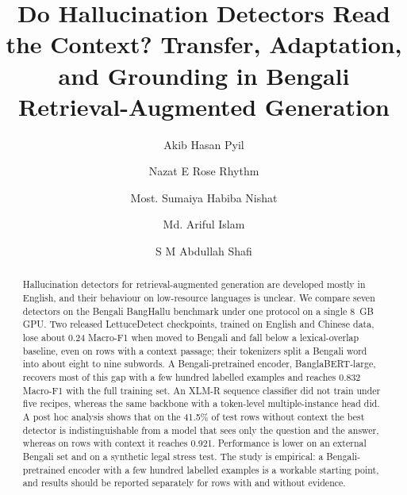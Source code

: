 \documentclass[manuscript,screen,review]{acmart}
\begin{document}
\title[Do Hallucination Detectors Read the Context?]{Do Hallucination Detectors Read the Context? Transfer, Adaptation, and Grounding in Bengali Retrieval-Augmented Generation}

\author{Akib Hasan Pyil}

\author{Nazat E Rose Rhythm}

\author{Most. Sumaiya Habiba Nishat}

\author{Md. Ariful Islam}

\author{S M Abdullah Shafi}

\renewcommand{\shortauthors}{Pyil et al.}

\begin{abstract}
Hallucination detectors for retrieval-augmented generation are developed mostly in English, and their behaviour on low-resource languages is unclear. We compare seven detectors on the Bengali BangHallu benchmark under one protocol on a single 8~GB GPU. Two released LettuceDetect checkpoints, trained on English and Chinese data, lose about 0.24 Macro-F1 when moved to Bengali and fall below a lexical-overlap baseline, even on rows with a context passage; their tokenizers split a Bengali word into about eight to nine subwords. A Bengali-pretrained encoder, BanglaBERT-large, recovers most of this gap with a few hundred labelled examples and reaches 0.832 Macro-F1 with the full training set. An XLM-R sequence classifier did not train under five recipes, whereas the same backbone with a token-level multiple-instance head did. A post hoc analysis shows that on the 41.5\% of test rows without context the best detector is indistinguishable from a model that sees only the question and the answer, whereas on rows with context it reaches 0.921. Performance is lower on an external Bengali set and on a synthetic legal stress test. The study is empirical: a Bengali-pretrained encoder with a few hundred labelled examples is a workable starting point, and results should be reported separately for rows with and without evidence.
\end{abstract}
\end{document}
